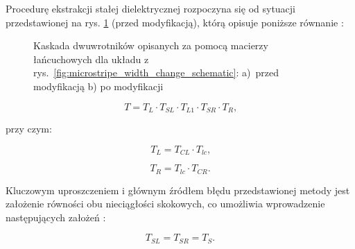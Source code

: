 Procedurę ekstrakcji stałej dielektrycznej rozpoczyna się od sytuacji przedstawionej na rys. \ref{fig:microstripe_width_change_cascade_t1} (przed modyfikacją), którą opisuje poniższe równanie \cite{cite:two_lines_method_trace}:

\begin{figure}[tbh!]
     \centering
     \begin{subfigure}[b]{1\textwidth}
         \centering
         {
         \caption{}
         \label{fig:microstripe_width_change_cascade_t1}}
     \end{subfigure}
     \hfill
     \begin{subfigure}[b]{1\textwidth}
         \centering
         {}
         \caption{}
         \label{fig:microstripe_width_change_cascade_t2}
     \end{subfigure}
        \caption{Kaskada dwuwrotników opisanych za pomocą macierzy łańcuchowych dla układu z rys.~\ref{fig:microstripe_width_change_schematic}: a)~przed modyfikacją b) po modyfikacji}
        \label{fig:microstripe_width_change_cascade}
\end{figure}

 \begin{equation}
    \label{cascade_main_eq}
      T=T_L\cdot T_{SL}\cdot T_{L1}\cdot T_{SR}\cdot T_R \text{,}
 \end{equation}

\noindent przy czym:

\begin{equation}
    \label{cascade_main_1_eq}
      T_L = T_{CL} \cdot T_{lc} \text{,}
 \end{equation}

    \begin{equation}
    \label{cascade_main_2_eq}
      T_R = T_{lc} \cdot T_{CR} \text{.}
 \end{equation}

 \noindent Kluczowym uproszczeniem i głównym źródłem błędu przedstawionej metody jest założenie równości obu nieciągłości skokowych, co umożliwia wprowadzenie następujących założeń \cite{cite:two_lines_method_trace}:

    \begin{equation}
    \label{cascade_main_3_eq}
      T_{SL} = T_{SR} =T_{S} \text{.}
 \end{equation}

